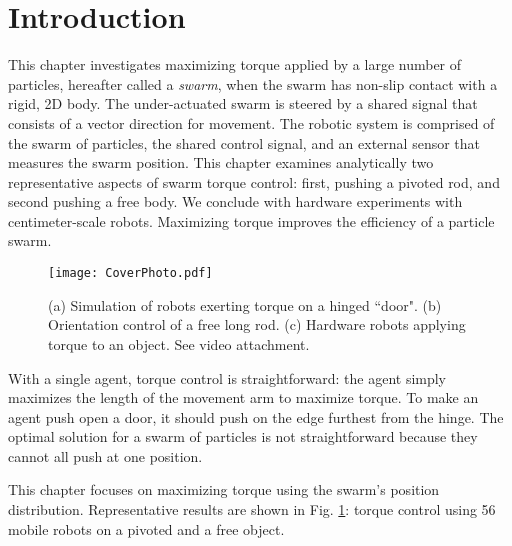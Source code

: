 \section{Introduction}\label{sec:Intro}

This chapter investigates maximizing torque applied by a large number of particles, hereafter called a \emph{swarm}, when the swarm has non-slip contact with a rigid, 2D body. 
 The under-actuated swarm is steered by a shared signal that consists of a vector direction for movement. 
  The robotic system is comprised of the swarm of particles, the shared control signal, and an external sensor that measures the swarm position.
   This chapter examines analytically two representative aspects of swarm torque control: first, pushing a pivoted rod, and second pushing a free body. 
   We conclude with hardware experiments with centimeter-scale robots. Maximizing torque improves the efficiency of a particle swarm.

 

\begin{figure}
\begin{center}
	\texttt{[image: CoverPhoto.pdf]}
\end{center}
\vspace{-1em}
\caption{\label{fig:FirstImage}
(a) Simulation of robots exerting torque on a hinged ``door".
(b) Orientation control of a free long rod.
(c) Hardware robots applying torque to an object. See video attachment.%
}
\vspace{-1em}
\end{figure}

With a single agent, torque control is straightforward: the agent simply maximizes the length of the movement arm to maximize torque. To make an agent push open a door, it should push on the edge furthest from the hinge. 
The optimal solution for a swarm of particles is not straightforward because they cannot all push at one position.

This chapter focuses on maximizing torque using the swarm's position distribution. 
Representative results are shown in Fig. \ref{fig:FirstImage}:  torque control using 56 mobile robots on a pivoted and a free object.



